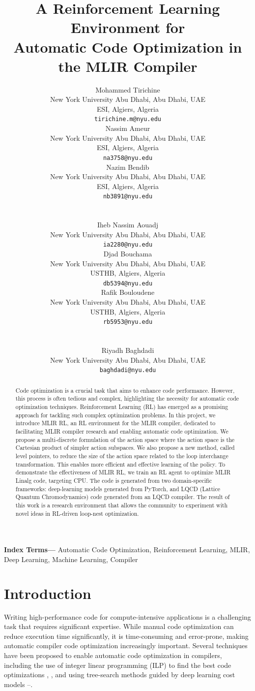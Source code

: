 \documentclass[10pt,twocolumn]{article}
\title{\LARGE\bfseries A Reinforcement Learning Environment for\\
Automatic Code Optimization in the MLIR Compiler}
\author{%
\parbox{0.31\textwidth}{\centering
Mohammed Tirichine\\
{\small New York University Abu Dhabi, Abu Dhabi, UAE}\\
{\small ESI, Algiers, Algeria}\\
{\small\texttt{tirichine.m@nyu.edu}}}%
\hfill
\parbox{0.31\textwidth}{\centering
Nassim Ameur\\
{\small New York University Abu Dhabi, Abu Dhabi, UAE}\\
{\small ESI, Algiers, Algeria}\\
{\small\texttt{na3758@nyu.edu}}}%
\hfill
\parbox{0.31\textwidth}{\centering
Nazim Bendib\\
{\small New York University Abu Dhabi, Abu Dhabi, UAE}\\
{\small ESI, Algiers, Algeria}\\
{\small\texttt{nb3891@nyu.edu}}}%
\\[0.8em]
\parbox{0.31\textwidth}{\centering
Iheb Nassim Aouadj\\
{\small New York University Abu Dhabi, Abu Dhabi, UAE}\\
{\small\texttt{ia2280@nyu.edu}}}%
\hfill
\parbox{0.31\textwidth}{\centering
Djad Bouchama\\
{\small New York University Abu Dhabi, Abu Dhabi, UAE}\\
{\small USTHB, Algiers, Algeria}\\
{\small\texttt{db5394@nyu.edu}}}%
\hfill
\parbox{0.31\textwidth}{\centering
Rafik Bouloudene\\
{\small New York University Abu Dhabi, Abu Dhabi, UAE}\\
{\small USTHB, Algiers, Algeria}\\
{\small\texttt{rb5953@nyu.edu}}}%
\\[0.8em]
\parbox{0.5\textwidth}{\centering
Riyadh Baghdadi\\
{\small New York University Abu Dhabi, Abu Dhabi, UAE}\\
{\small\texttt{baghdadi@nyu.edu}}}%
}
\date{}
\newenvironment{IEEEkeywords}{\par\medskip\noindent\textbf{Index Terms---}}{\par}
\begin{document}
\maketitle

\begin{abstract}
\noindent Code optimization is a crucial task that aims to enhance code performance. However, this process is often tedious and complex, highlighting the necessity for automatic code optimization techniques. Reinforcement Learning (RL) has emerged as a promising approach for tackling such complex optimization problems. In this project, we introduce MLIR RL, an RL environment for the MLIR compiler, dedicated to facilitating MLIR compiler research and enabling automatic code optimization. We propose a multi-discrete formulation of the action space where the action space is the Cartesian product of simpler action subspaces. We also propose a new method, called level pointers, to reduce the size of the action space related to the loop interchange transformation. This enables more efficient and effective learning of the policy. To demonstrate the effectiveness of MLIR RL, we train an RL agent to optimize MLIR Linalg code, targeting CPU. The code is generated from two domain-specific frameworks: deep-learning models generated from PyTorch, and LQCD (Lattice Quantum Chromodynamics) code generated from an LQCD compiler. The result of this work is a research environment that allows the community to experiment with novel ideas in RL-driven loop-nest optimization.
\end{abstract}

\begin{IEEEkeywords}
Automatic Code Optimization, Reinforcement Learning, MLIR, Deep Learning, Machine Learning, Compiler
\end{IEEEkeywords}
\vspace{1em}

\section{Introduction}

Writing high-performance code for compute-intensive applications is a challenging task that requires significant expertise. While manual code optimization can reduce execution time significantly, it is time-consuming and error-prone, making automatic compiler code optimization increasingly important. Several techniques have been proposed to enable automatic code optimization in compilers, including the use of integer linear programming (ILP) to find the best code optimizations \cite{ref1}, \cite{ref2}, and using tree-search methods guided by deep learning cost models \cite{ref3}--\cite{ref5}.
\end{document}
